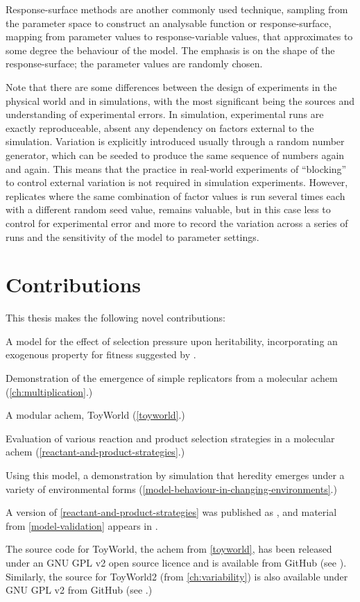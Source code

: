 Response-surface methods are another commonly used technique, sampling from the parameter space to construct an analysable function or response-surface, mapping from parameter values to response-variable values, that approximates to some degree the behaviour of the model. The emphasis is on the shape of the response-surface; the parameter values are randomly chosen.

Note that there are some differences between the design of experiments in the physical world and in simulations, with the most significant being the sources and understanding of experimental errors. In simulation, experimental runs are exactly reproduceable, absent any dependency on factors external to the simulation. Variation is explicitly introduced usually through a random number generator, which can be seeded to produce the same sequence of numbers again and again. This means that the practice in real-world experiments of ``blocking'' to control external variation is not required in simulation experiments. However, \gls{replicate}s where the same combination of factor values is run several times each with a different random seed value, remains valuable, but in this case less to control for experimental error and more to record the variation across a series of runs and the sensitivity of the model to parameter settings.

\section{Contributions}\label{contributions}

This thesis makes the following novel contributions:

\begin{compactenum}
\item A model for the effect of selection pressure upon heritability, incorporating an exogenous property for fitness suggested by \textcite{Bourrat2015}.
\item Demonstration of the emergence of simple replicators \parencite{Zachar2010} from a molecular \gls{achem} (\cref{ch:multiplication}.)
\item A modular \gls{achem}, ToyWorld (\cref{toyworld}.)
\item Evaluation of various reaction and product selection strategies in a molecular \gls{achem} (\cref{reactant-and-product-strategies}.)

\item Using this model, a demonstration by simulation that heredity emerges under a variety of environmental forms (\cref{model-behaviour-in-changing-environments}.)
\end{compactenum}

A version of \cref{reactant-and-product-strategies} was published as \textcite{Young2015}, and material from \cref{model-validation} appears in \textcite{Young2013}.

The source code for ToyWorld, the \gls{achem} from \cref{toyworld}, has been released under an GNU GPL v2 open source licence and is available from GitHub (see \cite{toyworld}). Similarly, the source for ToyWorld2 (from \cref{ch:variability}) is also available under GNU GPL v2 from GitHub (see \cite{toyworld2}.)


